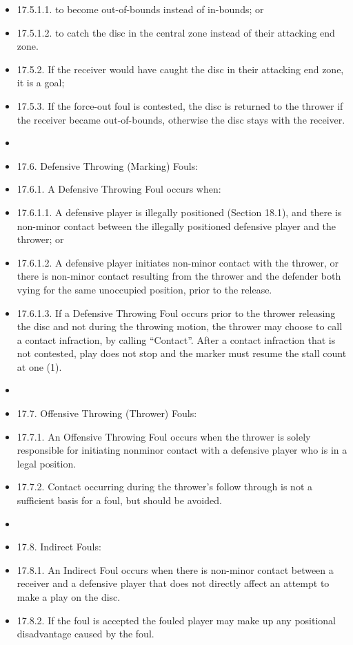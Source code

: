 \begin{itemize}
    \item 17.5.1.1. to become out-of-bounds instead of in-bounds; or
    \item 17.5.1.2. to catch the disc in the central zone instead of their attacking end zone.
    \item 17.5.2. If the receiver would have caught the disc in their attacking end zone, it is a goal;
    \item 17.5.3. If the force-out foul is contested, the disc is returned to the thrower if the receiver became out-of-bounds, otherwise the disc stays with the receiver.
    \item 
    \item 17.6. Defensive Throwing (Marking) Fouls:
    \item 17.6.1. A Defensive Throwing Foul occurs when:
    \item 17.6.1.1. A defensive player is illegally positioned (Section 18.1), and there is non-minor contact between the illegally positioned defensive player and the thrower; or
    \item 17.6.1.2. A defensive player initiates non-minor contact with the thrower, or there is non-minor contact resulting from the thrower and the defender both vying for the same unoccupied position, prior to the release.
    \item 17.6.1.3. If a Defensive Throwing Foul occurs prior to the thrower releasing the disc and not during the throwing motion, the thrower may choose to call a contact infraction, by calling “Contact”. After a contact infraction that is not contested, play does not stop and the marker must resume the stall count at one (1).
    \item 
    \item 17.7. Offensive Throwing (Thrower) Fouls:
    \item 17.7.1. An Offensive Throwing Foul occurs when the thrower is solely responsible for initiating nonminor contact with a defensive player who is in a legal position.
    \item 17.7.2. Contact occurring during the thrower's follow through is not a sufficient basis for a foul, but should be avoided.
    \item 
    \item 17.8. Indirect Fouls:
    \item 17.8.1. An Indirect Foul occurs when there is non-minor contact between a receiver and a defensive player that does not directly affect an attempt to make a play on the disc.
    \item 17.8.2. If the foul is accepted the fouled player may make up any positional disadvantage caused by the foul.

\end{itemize}

